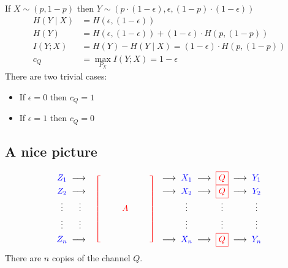 \documentclass{article}
\begin{document}
If $X\sim (p,1-p)$ then $Y\sim (p\cdot (1-\epsilon), \epsilon, (1-p)\cdot(1-\epsilon))$
\begin{align*}
    H(Y\mid X) &= H(\epsilon,(1-\epsilon))\\
    H(Y) &= H(\epsilon, (1-\epsilon)) + (1-\epsilon)\cdot H(p,(1-p))\\
    I(Y;X) &= H(Y) - H(Y\mid X) = (1-\epsilon)\cdot H(p,(1-p))\\
    c_Q &= \max_{P_X} I(Y;X)=1-\epsilon
\end{align*}
There are two trivial cases:
\begin{itemize}
    \item If $\epsilon=0$ then $c_Q=1$
    \item If $\epsilon=1$ then $c_Q=0$
\end{itemize}

\subsection{A nice picture}
\[
\renewcommand{\arraystretch}{1.2}
\begin{array}{c@{\;\;}c}
{\color{blue}Z_1} & \longrightarrow \vphantom{\boxed{Q}} \\
{\color{blue}Z_2} & \longrightarrow \vphantom{\boxed{Q}} \\
\vdots & \vdots \vphantom{\boxed{Q}} \\
\vdots & \vdots \vphantom{\boxed{Q}} \\
{\color{blue}Z_n} & \longrightarrow \vphantom{\boxed{Q}}
\end{array}
\;
{\color{red}\left[
\begin{array}{c}
\vphantom{\boxed{Q}} \\
\vphantom{\boxed{Q}} \\
\qquad A \qquad \vphantom{\boxed{Q}} \\
\vphantom{\boxed{Q}} \\
\vphantom{\boxed{Q}}
\end{array}
\right]}
\;
\begin{array}{c@{\;\;}c@{\;\;}c@{\;\;}c@{\;\;}c@{\;\;}c}
\longrightarrow & {\color{blue}X_1} & \longrightarrow & {\color{red}\boxed{Q}} & \longrightarrow & {\color{blue}Y_1} \\
\longrightarrow & {\color{blue}X_2} & \longrightarrow & {\color{red}\boxed{Q}} & \longrightarrow & {\color{blue}Y_2} \\
 & \vdots & & \vdots & & \vdots \vphantom{\boxed{Q}} \\
 & \vdots & & \vdots & & \vdots \vphantom{\boxed{Q}} \\
\longrightarrow & {\color{blue}X_n} & \longrightarrow & {\color{red}\boxed{Q}} & \longrightarrow & {\color{blue}Y_n}
\end{array}
\]
There are $n$ copies of the channel $Q$.
\end{document}
